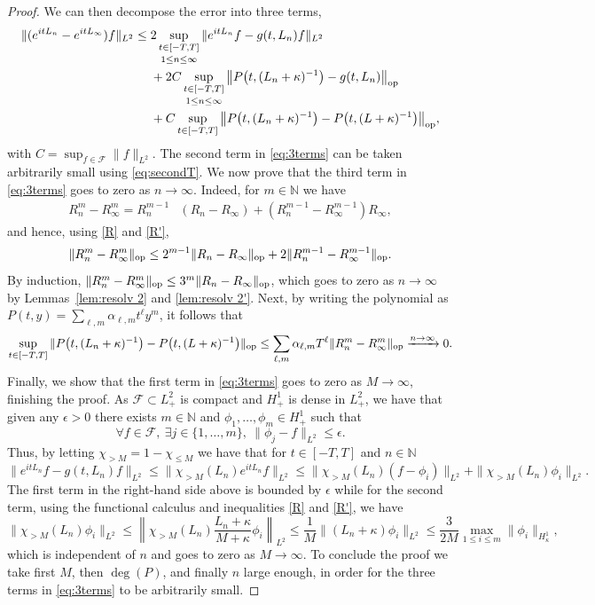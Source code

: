 \documentclass [11pt] {article}
\newcommand{\<}{\langle}
\renewcommand{\>}{\rangle}
\newcommand{\op}{\textup{op}}
\begin{document}
\begin{proof}
We can then decompose the error into three terms,
\begin{align}\label{eq:3terms}
\| (e^{itL_n} - e^{itL_\infty})f \|_{L^2}\nonumber
{}\leq{}& 2\sup_{\substack{t \in [-T,T] \\[.2em] 1\le n \le \infty }}\| e^{itL_{n}}f - g(t, L_n)f \|_{L^2} \\
&+ 2C\sup_{\substack{t \in [-T,T] \\[.2em] 1\le n \le \infty }} \big\|  P\big(t, (L_n+\kappa)^{-1}\big) - g(t, L_n) \big\|_{\op} \\\nonumber
&+ C\sup_{t\in[-T,T]}\big\|  P\big(t, (L_n+\kappa)^{-1}\big) - P\big(t,(L+\kappa)^{-1}\big) \big\|_{\op},
\end{align}
with $C = \sup_{f\in \mathcal{F}} \| f\|_{L^2}$. The second term in \eqref{eq:3terms} can be taken arbitrarily small using \eqref{eq:secondT}. We now prove that the third term in \eqref{eq:3terms} goes to zero as $n\to \infty$. Indeed, for $m\in \mathbb{N}$ we have
\begin{align*}
R_n^{m} - R_\infty^{m} = R_n^{m-1} &\left( R_n - R_\infty \right) 
+\left(R_n^{m-1} - R_\infty^{m-1} \right)R_\infty,
\end{align*}
and hence, using \eqref{R} and \eqref{R'},
\[
\|R_n^{m} - R^{m}_\infty \|_\op \le 2^{m-1}\|R_n - R_\infty \|_\op + 2
\|R_n^{m-1} - R_\infty^{m-1}\|_\op.
\]
By induction, $\|R_n^{m} - R^{m}_\infty \|_\op \le 3^m \|R_n - R_\infty \|_\op$, which goes to zero as $n\to \infty$ by Lemmas~\ref{lem:resolv 2} and \ref{lem:resolv 2'}.
Next, by writing the polynomial as $P(t,y) = \sum_{\ell,m}\alpha_{\ell,m} t^{\ell} y^{m}$, it follows that
\[
\sup_{t\in[-T,T]}\|  P\big(t, (L_n+\kappa)^{-1}\big) - P\big(t,(L+\kappa)^{-1}\big)\|_{\op} \le \sum_{\ell, m} \alpha_{\ell,m} T^{\ell} \|R_n^{m} - R_\infty^{m} \|_\op \xrightarrow{n\to\infty} 0 .
\]
%
Finally, we show that the first term in \eqref{eq:3terms} goes to zero as $M \to \infty$, finishing the proof. As $\mathcal{F} \subset L^2_+$ is compact and $H^1_{+}$ is dense in $L^2_{+}$, we have that given any $\epsilon>0$ there exists $m\in\mathbb{N}$ and $\phi_1, \dots, \phi_m \in H^1_{+}$ such that 
\[
\forall f\in\mathcal{F}, \ \exists j \in \{1,\dots, m\},\ \|\phi_j - f\|_{L^2} \le \epsilon.
\]
Thus, by letting $\chi_{>M} = 1-\chi_{\le M}$ we have that for $t\in[-T,T]$ and $n\in\mathbb{N}$
\[
\| e^{itL_{n}}f - g(t, L_n)f \|_{L^2} \le \| \chi_{> M}(L_n)e^{itL_n}f\|_{L^2} \le \| \chi_{>M}(L_n) (f-\phi_i) \|_{L^2} + \| \chi_{>M}(L_{n})\phi_i\|_{L^2}.
\]
The first term in the right-hand side above is bounded by $\epsilon$ while for the second term, using the functional calculus and inequalities \eqref{R} and \eqref{R'}, we have
\[
\| \chi_{>M}(L_n) \phi_i\|_{L^2} \le \left\| \chi_{>M}(L_n)\frac{L_n+\kappa}{M+\kappa}\phi_i\right\|_{L^2}
\le \frac{1}{M} \| (L_n+ \kappa)\phi_i\|_{L^2}
\le \frac{3}{2M} \max_{1\le i\le m}\| \phi_i\|_{H^1_{\kappa}},
\]
which is independent of $n$ and goes to zero as $M\to \infty$.
To conclude the proof we take first $M$, then $\deg(P)$, and finally $n$ large enough, in order for the three terms in \eqref{eq:3terms} to be arbitrarily small. \qedhere

\end{proof}
\end{document}

